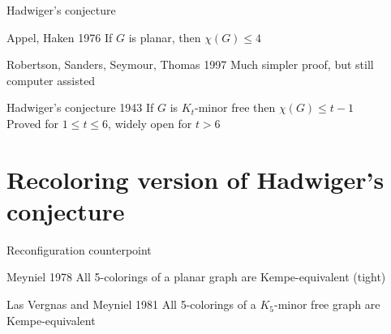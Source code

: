 \documentclass[11pt,xcolor=dvipsnames,presentation]{beamer}
\begin{document}
\begin{frame}{Hadwiger's conjecture}

  \begin{block}{Appel, Haken 1976}
    If $G$ is planar, then $\chi(G) \le 4$
  \end{block}

  \begin{block}{Robertson, Sanders, Seymour, Thomas 1997}
    Much simpler proof, but still computer assisted 
  \end{block}
  
  \begin{alertblock}{Hadwiger's conjecture 1943}
    If $G$ is $K_t$-minor free then $\chi(G) \le t-1$\\
    Proved for $1 \le t \le 6$, widely open for $t > 6$
  \end{alertblock}
\end{frame}

\section{Recoloring version of Hadwiger's conjecture}
\begin{frame}{Reconfiguration counterpoint}

  \begin{block}{Meyniel 1978}
    All 5-colorings of a planar graph are Kempe-equivalent (tight)
  \end{block}

  \begin{block}{Las Vergnas and Meyniel 1981}
    All 5-colorings of a $K_5$-minor free graph are Kempe-equivalent
  \end{block}

\end{frame}
\end{document}
